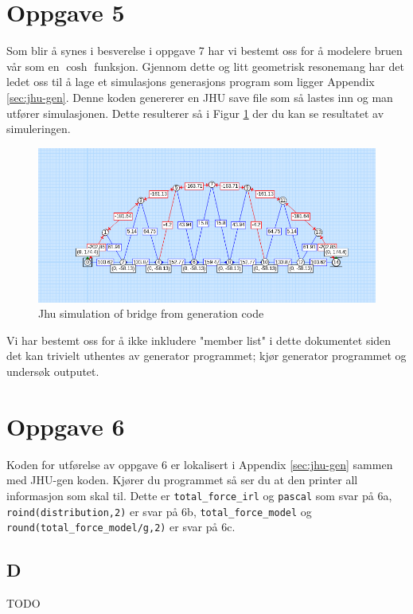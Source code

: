 \documentclass{report}
\begin{document}
\section{Oppgave 5}

Som blir å synes i besverelse i oppgave 7 har vi bestemt oss for å modelere bruen vår som en $\cosh$ funksjon. Gjennom dette og litt geometrisk resonemang har det ledet oss til å lage et simulasjons generasjons program som ligger Appendix \ref{sec:jhu-gen}. Denne koden genererer en JHU save file som så lastes inn og man utfører simulasjonen. Dette resulterer så i Figur \ref{fig:jhu} der du kan se resultatet av simuleringen.

\begin{figure}[H]
	\centering
	\includegraphics [width=.8\linewidth]{jhu}
	\caption{Jhu simulation of bridge from generation code}
	\label{fig:jhu}
\end{figure}

Vi har bestemt oss for å ikke inkludere "member list" i dette dokumentet siden det kan trivielt uthentes av generator programmet; kjør generator programmet og undersøk outputet.

\section{Oppgave 6}

Koden for utførelse av oppgave 6 er lokalisert i Appendix \ref{sec:jhu-gen} sammen med JHU-gen koden. Kjører du programmet så ser du at den printer all informasjon som skal til. Dette er \lstinline{total_force_irl} og \lstinline{pascal} som svar på 6a, \lstinline{roind(distribution,2)} er svar på 6b, \lstinline{total_force_model} og \lstinline{round(total_force_model/g,2)} er svar på 6c.

\subsection*{D}

TODO
\end{document}
